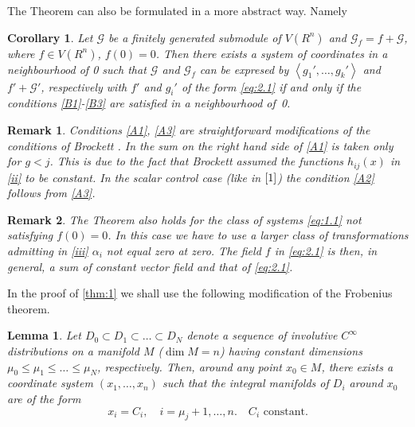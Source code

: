 \documentclass[leqno]{article}
\theoremstyle{plain}
\newtheorem{lemma}{Lemma}
\newtheorem{remark}{Remark}
\newtheorem{corollary}{Corollary}
\numberwithin{equation}{section}
\begin{document}
The Theorem can also be formulated in a more abstract way. Namely

\begin{corollary}
	Let $\mathscr{G}$ be a finitely generated submodule of $V\left(R^{n}\right)$ and $\mathscr{G}_{f}=f+\mathscr{G}$, where $f \in V\left(R^{n}\right)$, $f(0)=0$.
	Then there exists a system of coordinates in a neighbourhood of 0 such that $\mathscr{G}$ and $\mathscr{G}_{f}$ can be expresed by $\left\langle g_{1}', \ldots, g_{k}'\right\rangle$ and $f'+\mathscr{G}'$, respectively with $f'$ and $g_{i}'$ of the form \eqref{eq:2.1} if and only if the conditions \eqref{B1}-\eqref{B3} are satisfied in a neighbourhood of~0.
\end{corollary}
	
\begin{remark}
	 Conditions \eqref{A1}, \eqref{A3} are straightforward modifications of the conditions of Brockett \cite{1}. 
	 In \cite{1} the sum on the right hand side of \eqref{A1} is taken only for $g<j$. 
	 This is due to the fact that Brockett assumed the functions $h_{ij}(x)$ in \eqref{ii} to be constant. 
	 In the scalar control case (like in $\cite{1}$) the condition \eqref{A2} follows from \eqref{A3}.
\end{remark}

\begin{remark}
	The Theorem also holds for the class of systems \eqref{eq:1.1} not satisfying $f(0)=0$. 
	In this case we have to use a larger class of transformations admitting in \eqref{iii} $\alpha_{i}$ not equal zero at zero. 
	The field $f$ in \eqref{eq:2.1} is then, in general, a sum  of constant vector field and that of \eqref{eq:2.1}.
\end{remark}

In the proof of \cref{thm:1} we shall use the following modification of the Frobenius theorem.

\begin{lemma}
	\label{lemma:1}
	Let $D_{0} \subset D_{1} \subset \ldots \subset D_{N}$ denote a sequence of involutive $C^{\infty}$ distributions
	on a manifold $M$ ($\operatorname{dim} M=n$) having constant dimensions $\mu_{0} \leqslant \mu_{1} \leqslant \ldots \leqslant \mu_{N}$, respectively. 
	Then, around any point $x_{0} \in M$, there exists a coordinate system $\left(x_{1}, \ldots, x_{n}\right)$ such that the integral manifolds of $D_{i}$ around $x_{0}$ are of the form
	\begin{equation*}
		x_i = C_i, \quad i = \mu_j+1, \dotsc, n.
		\quad C_i \text{ constant}.
	\end{equation*}
\end{lemma}
\end{document}
